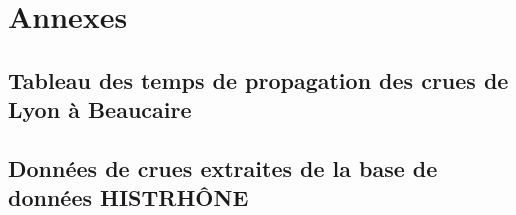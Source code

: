 \chapter*{Annexes}
	\section*{Tableau des temps de propagation des crues de Lyon à Beaucaire}
	
	\section*{Données de crues extraites de la base de données HISTRHÔNE}